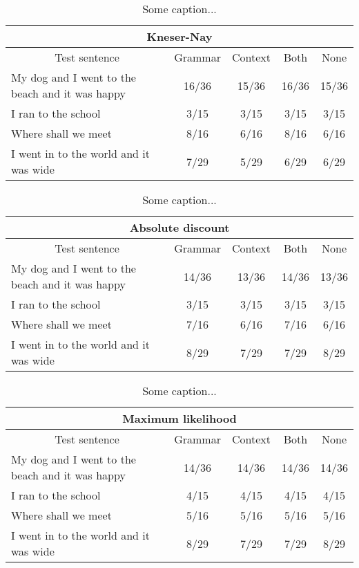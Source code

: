 
\begin{table}[H]
\centering
\caption{Some caption...}
{\scriptsize
\begin{tabular}{ |p{}|c|c|c|c| }

	\hline
	\multicolumn{5}{|c|}{Kneser-Nay} \\
	\hline
	\multicolumn{1}{|c|}{Test sentence} & Grammar & Context & Both & None \\
	\hline
	My dog and I went to the beach and it was happy & 16/36 & 15/36 & 16/36 & 15/36 \\
	\hline
	I ran to the school & 3/15 & 3/15 & 3/15 & 3/15 \\
	\hline
	Where shall we meet & 8/16 & 6/16 & 8/16 & 6/16 \\
	\hline
	I went in to the world and it was wide & 7/29 & 5/29 & 6/29 & 6/29 \\
	\hline
\end{tabular}
}
\end{table}

\vspace{-1cm}
\begin{table}[H]
\centering
\caption{Some caption...}
{\scriptsize
\begin{tabular}{ |p{}|c|c|c|c| }
	\hline
	\multicolumn{5}{|c|}{Absolute discount} \\
	\hline
	\multicolumn{1}{|c|}{Test sentence} & Grammar & Context & Both & None \\
	\hline
	My dog and I went to the beach and it was happy & 14/36 & 13/36 & 14/36 & 13/36 \\
	\hline
	I ran to the school & 3/15 & 3/15 & 3/15 & 3/15 \\
	\hline
	Where shall we meet & 7/16 & 6/16 & 7/16 & 6/16 \\
	\hline
	I went in to the world and it was wide & 8/29 & 7/29 & 7/29 & 8/29 \\
	\hline
\end{tabular}
}
\end{table}

\vspace{-1cm}
\begin{table}[H]
\centering
\caption{Some caption...}
{\scriptsize
\begin{tabular}{ |p{}|c|c|c|c| }
	\hline
	\multicolumn{5}{|c|}{Maximum likelihood} \\
	\hline
	\multicolumn{1}{|c|}{Test sentence} & Grammar & Context & Both & None \\
	\hline
	My dog and I went to the beach and it was happy & 14/36 & 14/36 & 14/36 & 14/36 \\
	\hline
	I ran to the school & 4/15 & 4/15 & 4/15 & 4/15 \\
	\hline
	Where shall we meet & 5/16 & 5/16 & 5/16 & 5/16 \\
	\hline
	I went in to the world and it was wide & 8/29 & 7/29 & 7/29 & 8/29 \\
	\hline
\end{tabular}
}
\end{table}
\vspace{-1cm}

